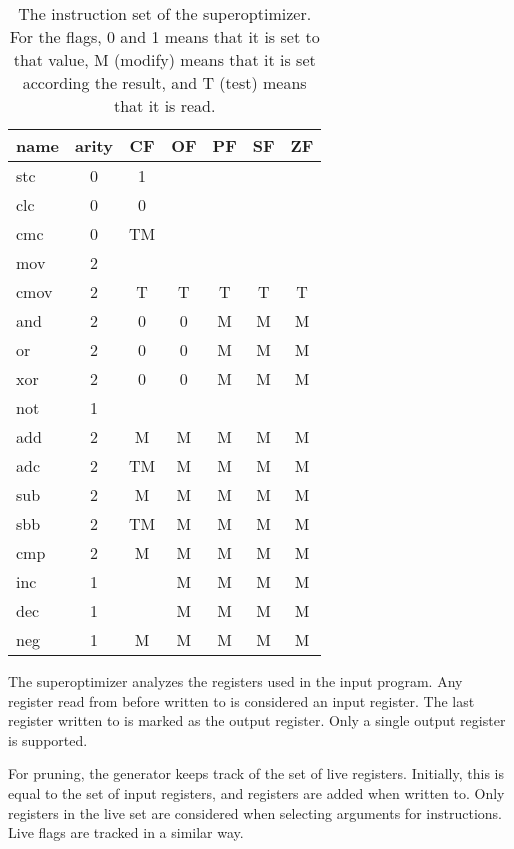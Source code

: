 \documentclass[a4paper,11pt]{kth-mag}
\begin{document}
\begin{table}
\centering
\begin{tabular}{lc|ccccc}
name & arity & CF & OF & PF & SF & ZF \\
\hline
stc  & 0     & 1  &    &    &    &    \\
clc  & 0     & 0  &    &    &    &    \\
cmc  & 0     & TM &    &    &    &    \\
mov  & 2     &    &    &    &    &    \\
cmov & 2     & T  & T  & T  & T  & T  \\
and  & 2     & 0  & 0  & M  & M  & M  \\
or   & 2     & 0  & 0  & M  & M  & M  \\
xor  & 2     & 0  & 0  & M  & M  & M  \\
not  & 1     &    &    &    &    &    \\
add  & 2     & M  & M  & M  & M  & M  \\
adc  & 2     & TM & M  & M  & M  & M  \\
sub  & 2     & M  & M  & M  & M  & M  \\
sbb  & 2     & TM & M  & M  & M  & M  \\
cmp  & 2     & M  & M  & M  & M  & M  \\
inc  & 1     &    & M  & M  & M  & M  \\
dec  & 1     &    & M  & M  & M  & M  \\
neg  & 1     & M  & M  & M  & M  & M  \\
\end{tabular}
\caption{The instruction set of the superoptimizer.
For the flags, 0 and 1 means that it is set to that value, M (modify) means that it is set according the result, and T (test) means that it is read.}
\label{tab:insns}
\end{table}

The superoptimizer analyzes the registers used in the input program.
Any register read from before written to is considered an input register.
The last register written to is marked as the output register.
Only a single output register is supported.

For pruning, the generator keeps track of the set of live registers.
Initially, this is equal to the set of input registers, and registers are added when written to.
Only registers in the live set are considered when selecting arguments for instructions.
Live flags are tracked in a similar way.

\end{document}
